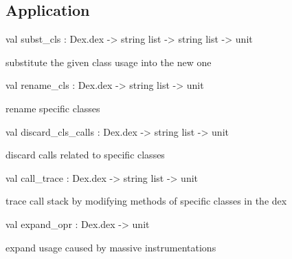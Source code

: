 \documentclass[11pt]{article}
\begin{document}
\subsection{Application}




\label{val:Modify.subst-underscorecls}\begin{ocamldoccode}
val subst_cls : Dex.dex -> string list -> string list -> unit
\end{ocamldoccode}
\begin{ocamldocdescription}
substitute the given class usage into the new one


\end{ocamldocdescription}




\label{val:Modify.rename-underscorecls}\begin{ocamldoccode}
val rename_cls : Dex.dex -> string list -> unit
\end{ocamldoccode}
\begin{ocamldocdescription}
rename specific classes


\end{ocamldocdescription}




\label{val:Modify.discard-underscorecls-underscorecalls}\begin{ocamldoccode}
val discard_cls_calls : Dex.dex -> string list -> unit
\end{ocamldoccode}
\begin{ocamldocdescription}
discard calls related to specific classes


\end{ocamldocdescription}




\label{val:Modify.call-underscoretrace}\begin{ocamldoccode}
val call_trace : Dex.dex -> string list -> unit
\end{ocamldoccode}
\begin{ocamldocdescription}
trace call stack by modifying methods of specific classes in the dex


\end{ocamldocdescription}




\label{val:Modify.expand-underscoreopr}\begin{ocamldoccode}
val expand_opr : Dex.dex -> unit
\end{ocamldoccode}
\begin{ocamldocdescription}
expand  usage caused by massive instrumentations


\end{ocamldocdescription}
\end{document}
